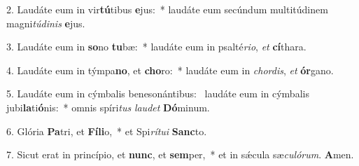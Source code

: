 2. Laudáte eum in vir\textbf{tú}tibus \textbf{e}jus:~*  laudáte eum secúndum multitúdinem magni\textit{tú}\textit{di}\textit{nis} \textbf{e}jus.\

3. Laudáte eum in \textbf{so}no \textbf{tu}bæ:~*  laudáte eum in psalté\textit{ri}\textit{o}, \textit{et} \textbf{cí}thara.\

4. Laudáte eum in týmpa\textbf{no}, et \textbf{cho}ro:~*  laudáte eum in \textit{chor}\textit{dis}, \textit{et} \textbf{ór}gano.\

5. Laudáte eum in cýmbalis benesonántibus: \dag\  laudáte eum in cýmbalis jubi\textbf{la}ti\textbf{ó}nis:~*  omnis spíri\textit{tus} \textit{lau}\textit{det} \textbf{Dó}minum.\

6. Glória \textbf{Pa}tri, et \textbf{Fí}\textbf{li}o,~*  et Spi\textit{rí}\textit{tu}\textit{i} \textbf{Sanc}to.\

7. Sicut erat in princípio, et \textbf{nunc}, et \textbf{sem}per,~*  et in sǽcula sæ\textit{cu}\textit{ló}\textit{rum}. \textbf{A}men.\

